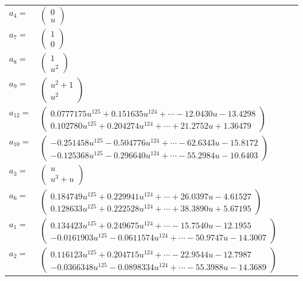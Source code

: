 \documentclass[1p]{elsarticle_modified}
\theoremstyle{definition}
\begin{document}
\begin{tabular}{m{7pt} m{180pt} m{7pt} m{180pt} }
\flushright $a_{4}=$&$\begin{pmatrix}0\\u\end{pmatrix}$ \\
\flushright $a_{7}=$&$\begin{pmatrix}1\\0\end{pmatrix}$ \\
\flushright $a_{8}=$&$\begin{pmatrix}1\\u^2\end{pmatrix}$ \\
\flushright $a_{9}=$&$\begin{pmatrix}u^2+1\\u^2\end{pmatrix}$ \\
\flushright $a_{12}=$&$\begin{pmatrix}0.0777175 u^{125}+0.151635 u^{124}+\cdots-12.0430 u-13.4298\\0.102780 u^{125}+0.204274 u^{124}+\cdots+21.2752 u+1.36479\end{pmatrix}$ \\
\flushright $a_{10}=$&$\begin{pmatrix}-0.251458 u^{125}-0.504776 u^{124}+\cdots-62.6343 u-15.8172\\-0.125368 u^{125}-0.296640 u^{124}+\cdots-55.2984 u-10.6403\end{pmatrix}$ \\
\flushright $a_{3}=$&$\begin{pmatrix}u\\u^3+u\end{pmatrix}$ \\
\flushright $a_{6}=$&$\begin{pmatrix}0.184749 u^{125}+0.229941 u^{124}+\cdots+26.0397 u-4.61527\\0.128633 u^{125}+0.222528 u^{124}+\cdots+38.3890 u+5.67195\end{pmatrix}$ \\
\flushright $a_{1}=$&$\begin{pmatrix}0.134423 u^{125}+0.249675 u^{124}+\cdots-15.7540 u-12.1955\\-0.0161903 u^{125}-0.0611574 u^{124}+\cdots-50.9747 u-14.3007\end{pmatrix}$ \\
\flushright $a_{2}=$&$\begin{pmatrix}0.116123 u^{125}+0.204715 u^{124}+\cdots-22.9544 u-12.7987\\-0.0366348 u^{125}-0.0898334 u^{124}+\cdots-55.3988 u-14.3689\end{pmatrix}$ \\

\end{tabular}
\end{document}
